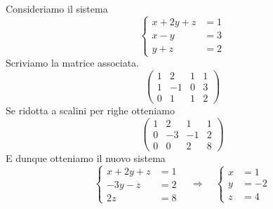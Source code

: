 \begin{example}
	Consideriamo il sistema
	\[
		\begin{cases}
			x + 2y + z & = 1 \\
			x - y      & = 3 \\
			y + z      & = 2
		\end{cases}
	\]
	Scriviamo la matrice associata.
	\[
		\begin{pmatrix}
			1 & 2  & 1 & 1 \\
			1 & -1 & 0 & 3 \\
			0 & 1  & 1 & 2
		\end{pmatrix}
	\]
	Se ridotta a scalini per righe otteniamo
	\[
		\begin{pmatrix}
			1 & 2  & 1  & 1 \\
			0 & -3 & -1 & 2 \\
			0 & 0  & 2  & 8
		\end{pmatrix}
	\]
	E dunque otteniamo il nuovo sistema
	\[
		\begin{cases}
			x + 2y + z & = 1 \\
			-3y - z    & = 2 \\
			2z         & = 8
		\end{cases}
		\quad \Rightarrow \quad
		\begin{cases}
			x & = 1  \\
			y & = -2 \\
			z & = 4
		\end{cases}
	\]
\end{example}
